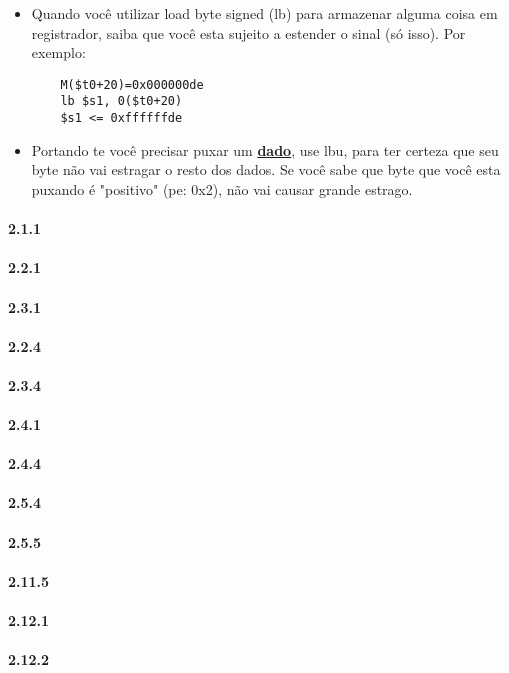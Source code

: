 \documentclass{article}
\begin{document}
\begin{itemize}
\item Quando você utilizar load byte signed (lb) para armazenar alguma coisa em 
registrador, saiba que você esta sujeito a estender o sinal (só isso). Por 
exemplo:

  \begin{verbatim}
    M($t0+20)=0x000000de
    lb $s1, 0($t0+20)
    $s1 <= 0xffffffde
  \end{verbatim}

\item Portando te você precisar puxar um \textbf{\color{Red} \underline{dado}}, 
use lbu, para ter certeza que seu byte não vai estragar o resto dos dados. Se 
você sabe que byte que você esta puxando é "positivo" (pe: 0x2), não vai causar 
grande estrago.

\end{itemize}

\paragraph{2.1.1}



\paragraph{2.2.1}

\paragraph{2.3.1}

\paragraph{2.2.4}

\paragraph{2.3.4}

\paragraph{2.4.1}

\paragraph{2.4.4}

\paragraph{2.5.4}

\paragraph{2.5.5}

\paragraph{2.11.5}

\paragraph{2.12.1}

\paragraph{2.12.2}
\end{document}
